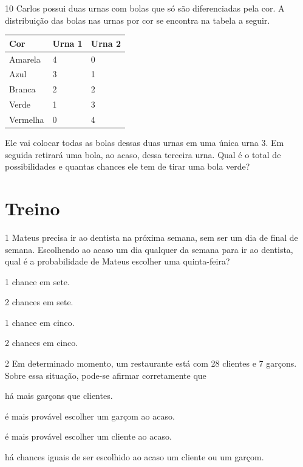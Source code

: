 \pagebreak
\num{10} Carlos possui duas urnas com bolas que só são diferenciadas pela cor. A
distribuição das bolas nas urnas por cor se encontra na tabela a
seguir.

\begin{longtable}[]{@{}lll@{}}
\toprule
Cor & Urna 1 & Urna 2\tabularnewline
\midrule
\endhead
Amarela & 4 & 0\tabularnewline
Azul & 3 & 1\tabularnewline
Branca & 2 & 2\tabularnewline
Verde & 1 & 3\tabularnewline
Vermelha & 0 & 4\tabularnewline
\bottomrule
\end{longtable}

Ele vai colocar todas as bolas dessas duas urnas em uma única urna 3. Em
seguida retirará uma bola, ao acaso, dessa terceira urna. Qual é o total de possibilidades e quantas chances ele tem de tirar uma bola verde?

\begin{mdframed}[linewidth=2pt,linecolor=salmao,roundcorner=2pt]


\vspace{1cm}
\end{mdframed}


\section*{Treino}

\num{1} Mateus precisa ir ao dentista na próxima semana, sem ser um dia de final de semana. Escolhendo ao acaso um dia
qualquer da semana para ir ao dentista, qual é a probabilidade de Mateus
escolher uma quinta-feira?

\begin{escolha}
\item
  1 chance em sete.
\item
  2 chances em sete.
\item
  1 chance em cinco.
\item
  2 chances em cinco.
\end{escolha}


\num{2} Em determinado momento, um restaurante está com 28 clientes e 7
garçons. Sobre essa situação, pode-se afirmar corretamente que

\begin{escolha}
\item
  há mais garçons que clientes.
\item
  é mais provável escolher um garçom ao acaso.
\item
  é mais provável escolher um cliente ao acaso.
\item
  há chances iguais de ser escolhido ao acaso um cliente ou um garçom.
\end{escolha}


